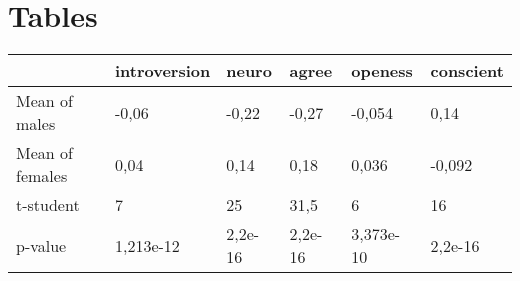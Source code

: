 \section{Tables}

\begin{table}[ht]
    \begin{center}
        {\footnotesize
        \begin{tabular}{l|l|l|l|l|l|}
        \hline \hline
               & introversion   & neuro    & agree   & openess   & conscient        \\
            \hline
                Mean of males    & -0,06 & -0,22   & -0,27 & -0,054 & 0,14   \\
                Mean of females  & 0,04 & 0,14 & 0,18 & 0,036 & -0,092  \\
                t-student        & 7 & 25 & 31,5 & 6 & 16   \\
                p-value          & 1,213e-12 & 2,2e-16 & 2,2e-16 & 3,373e-10 & 2,2e-16   \\
               
            \hline \hline
        \end{tabular}}
    \end{center}
    
\end{table}